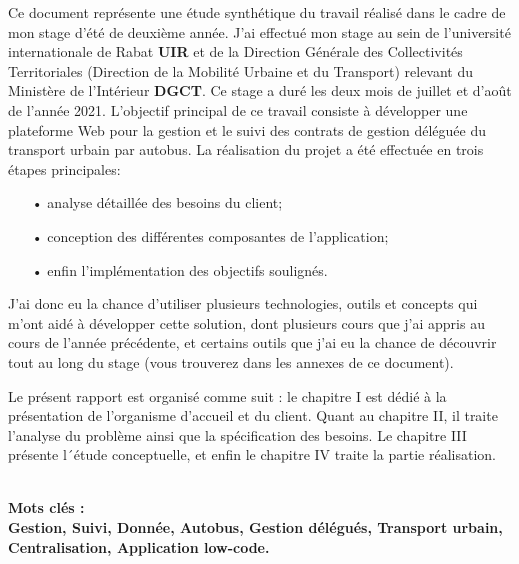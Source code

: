 Ce document représente une étude synthétique du travail réalisé dans le
cadre de mon stage d'été de deuxième année. J'ai effectué mon stage au sein de
l'université internationale de Rabat \textbf{UIR}  et de la Direction Générale des Collectivités Territoriales (Direction de la Mobilité Urbaine et du Transport) relevant du Ministère de l’Intérieur \textbf{DGCT}. Ce stage a duré les deux
mois de juillet et d'août de l'année 2021. L’objectif principal de ce travail
consiste à développer une plateforme Web pour la gestion et le suivi des
contrats de gestion déléguée du transport urbain par autobus. La réalisation du projet a été effectuée en trois étapes principales:
\begin{itemize}
	\item[•] analyse détaillée des besoins du client;
	\item[•] conception des différentes composantes de l'application;
	\item[•] enfin l'implémentation des objectifs soulignés.
\end{itemize}
J'ai donc eu la chance d'utiliser plusieurs technologies, outils et concepts qui m'ont aidé à développer cette solution, dont plusieurs cours que j'ai appris au cours de l'année précédente, et certains outils que j'ai eu la chance de découvrir tout au long du stage (vous trouverez dans les annexes de ce document).

Le présent rapport est organisé comme suit : le chapitre I est dédié à
la présentation de
l’organisme d’accueil et du client. Quant au chapitre II, il traite
l’analyse du problème ainsi que la spécification des besoins. Le
chapitre III présente l´étude conceptuelle, et enfin le chapitre IV traite la
partie réalisation.

\textbf	{\\Mots clés :\\ Gestion, Suivi, Donnée, Autobus, Gestion  délégués, Transport urbain, Centralisation, Application low-code.}
